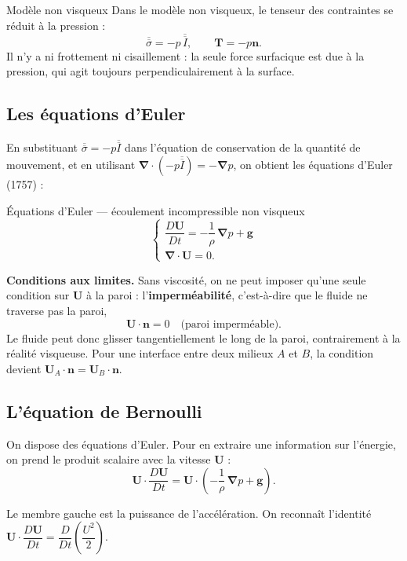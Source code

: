 \documentclass[11pt,a4paper]{report}
\newcommand{\ten}[1]{\overline{\overline{#1}}}   %
\begin{document}
\begin{defbox}{Modèle non visqueux}
Dans le modèle non visqueux, le tenseur des contraintes se réduit à la pression :
\[
    \ten{\sigma} = -p\,\ten{I}, \qquad \bm{T} = -p\bm{n}.
\]
Il n'y a ni frottement ni cisaillement : la seule force surfacique est due à la
pression, qui agit toujours perpendiculairement à la surface.
\end{defbox}

\subsection{Les équations d'Euler}

En substituant $\ten{\sigma} = -p\ten{I}$ dans l'équation de conservation de la
quantité de mouvement, et en utilisant
$\boldsymbol{\nabla}\cdot(-p\ten{I}) = -\boldsymbol{\nabla}p$, on obtient
les équations d'Euler (1757) :

\begin{importantbox}{Équations d'Euler --- écoulement incompressible non visqueux}
\[
    \begin{cases}
        \dfrac{D\bm{U}}{Dt} = -\dfrac{1}{\rho}\,\boldsymbol{\nabla}p + \bm{g}
        \\[10pt]
        \boldsymbol{\nabla}\cdot\bm{U} = 0.
    \end{cases}
\]
\end{importantbox}

\textbf{Conditions aux limites.} Sans viscosité, on ne peut imposer qu'une seule
condition sur $\bm{U}$ à la paroi : l'\textbf{imperméabilité}, c'est-à-dire que le
fluide ne traverse pas la paroi,
\[
    \bm{U}\cdot\bm{n} = 0 \quad \text{(paroi imperméable)}.
\]
Le fluide peut donc glisser tangentiellement le long de la paroi, contrairement à la
réalité visqueuse. Pour une interface entre deux milieux $A$ et $B$, la condition
devient $\bm{U}_A\cdot\bm{n} = \bm{U}_B\cdot\bm{n}$.

\subsection{L'équation de Bernoulli}

On dispose des équations d'Euler. Pour en extraire une information sur l'énergie,
on prend le produit scalaire avec la vitesse $\bm{U}$ :
\[
    \bm{U}\cdot\frac{D\bm{U}}{Dt}
    = \bm{U}\cdot\!\left(-\frac{1}{\rho}\,\boldsymbol{\nabla}p + \bm{g}\right).
\]

Le membre gauche est la puissance de l'accélération. On reconnaît l'identité
$\bm{U}\cdot\dfrac{D\bm{U}}{Dt} = \dfrac{D}{Dt}\!\left(\dfrac{U^2}{2}\right)$.
\end{document}
